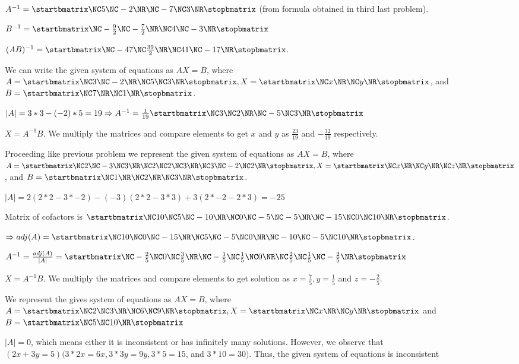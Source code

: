   $A^{-1} = \startbmatrix\NC 5\NC -2\NR\NC -7\NC 3\NR\stopbmatrix$ (from formula obtained in third last
  problem).

  $B^{-1} = \startbmatrix\NC -\frac{9}{2}\NC -\frac{7}{2}\NR\NC 4\NC -3\NR\stopbmatrix$

  $(AB)^{-1} = \startbmatrix\NC -47\NC \frac{39}{2}\NR\NC 41\NC -17\NR\stopbmatrix$.
\item We can write the given system of equations as $AX = B$, where $A = \startbmatrix\NC 3\NC -2\NR\NC 5\NC
  3\NR\stopbmatrix, X = \startbmatrix\NC x\NR\NC y\NR\stopbmatrix$, and $B = \startbmatrix\NC 7\NR\NC
  1\NR\stopbmatrix$.

  $|A| = 3*3 - (-2)*5 = 19\Rightarrow A^{-1} = \frac{1}{19}\startbmatrix\NC 3\NC 2\NR\NC -5\NC
  3\NR\stopbmatrix$

  $X = A^{-1}B$. We multiply the matrices and compare elements to get $x$ and $y$ as $\frac{23}{19}$ and
  $-\frac{32}{19}$ respectively.
\item Proceeding like previous problem we represent the given system of equations as $AX = B$, where $A
  = \startbmatrix\NC 2\NC -3\NC 3\NR\NC 2\NC 2\NC 3\NR\NC 3\NC -2\NC 2\NR\stopbmatrix, X = \startbmatrix\NC
  x\NR\NC y\NR\NC z\NR\stopbmatrix$, and $B = \startbmatrix\NC 1\NR\NC 2\NR\NC 3\NR\stopbmatrix$.

  $|A| = 2(2*2 - 3*-2) - (-3)(2*2 - 3*3) + 3(2*-2 - 2*3) = -25$

  Matrix of cofactors is $\startbmatrix\NC 10\NC 5\NC -10\NR\NC 0\NC -5\NC -5\NR\NC -15\NC 0\NC
  10\NR\stopbmatrix$.

  $\Rightarrow adj(A) = \startbmatrix\NC 10\NC 0\NC -15\NR\NC 5\NC -5\NC 0\NR\NC -10\NC -5\NC
  10\NR\stopbmatrix$.

  $A^{-1} = \frac{adj(A)}{|A|} = \startbmatrix\NC -\frac{2}{5}\NC 0\NC \frac{3}{5}\NR\NC -\frac{1}{5}\NC
  \frac{1}{5}\NC 0\NR\NC \frac{2}{5}\NC \frac{1}{5}\NC -\frac{2}{5}\NR\stopbmatrix$

  $X = A^{-1}B$. We multiply the matrices and compare elements to get solution as $x = \frac{7}{5}, y =
  \frac{1}{5}$ and $z = -\frac{2}{5}$.
\item We represent the gives system of equations as $AX = B$, where $A = \startbmatrix\NC 2\NC 3\NR\NC 6\NC
  9\NR\stopbmatrix, X = \startbmatrix\NC x\NR\NC y\NR\stopbmatrix$ and $B = \startbmatrix\NC 5\NC
  10\NR\stopbmatrix$

  $|A| = 0$, which means either it is inconsistent or has infinitely many solutions. However, we observe
  that $(2x + 3y = 5) (3 * 2x = 6x, 3 * 3y = 9y, 3 * 5 = 15$, and $3 * 10 = 30)$. Thus, the given system of
  equations is inconsistent
\stopitemize
